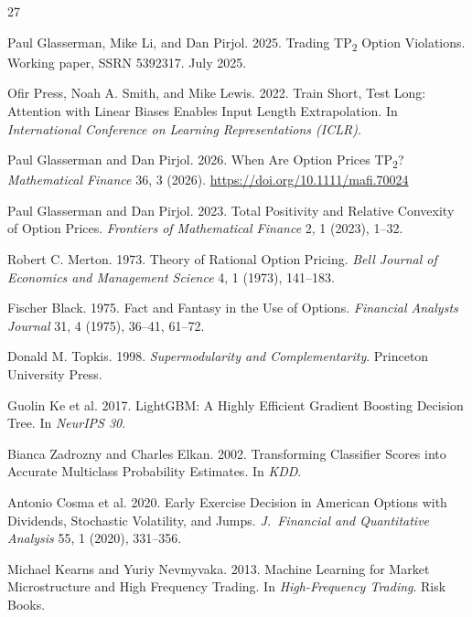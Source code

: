 \documentclass[sigconf,review,anonymous]{acmart}
\begin{document}

\begingroup
\footnotesize
\setlength{\itemsep}{0pt}
\setlength{\parskip}{0pt}
\begin{thebibliography}{27}

Paul Glasserman, Mike Li, and Dan Pirjol. 2025. Trading TP\textsubscript{2} Option Violations. Working paper, SSRN 5392317. July 2025.

Ofir Press, Noah A. Smith, and Mike Lewis. 2022. Train Short, Test Long: Attention with Linear Biases Enables Input Length Extrapolation. In \textit{International Conference on Learning Representations (ICLR)}.

Paul Glasserman and Dan Pirjol. 2026. When Are Option Prices TP\textsubscript{2}? \textit{Mathematical Finance} 36, 3 (2026). \url{https://doi.org/10.1111/mafi.70024}

Paul Glasserman and Dan Pirjol. 2023. Total Positivity and Relative Convexity of Option Prices. \textit{Frontiers of Mathematical Finance} 2, 1 (2023), 1--32.

Robert C. Merton. 1973. Theory of Rational Option Pricing. \textit{Bell Journal of Economics and Management Science} 4, 1 (1973), 141--183.

Fischer Black. 1975. Fact and Fantasy in the Use of Options. \textit{Financial Analysts Journal} 31, 4 (1975), 36--41, 61--72.

Donald M. Topkis. 1998. \textit{Supermodularity and Complementarity}. Princeton University Press.

Guolin Ke et al. 2017. LightGBM: A Highly Efficient Gradient Boosting Decision Tree. In \textit{NeurIPS 30}.

Bianca Zadrozny and Charles Elkan. 2002. Transforming Classifier Scores into Accurate Multiclass Probability Estimates. In \textit{KDD}.

Antonio Cosma et al. 2020. Early Exercise Decision in American Options with Dividends, Stochastic Volatility, and Jumps. \textit{J.\ Financial and Quantitative Analysis} 55, 1 (2020), 331--356.

Michael Kearns and Yuriy Nevmyvaka. 2013. Machine Learning for Market Microstructure and High Frequency Trading. In \textit{High-Frequency Trading}. Risk Books.


\end{thebibliography}
\end{document}
